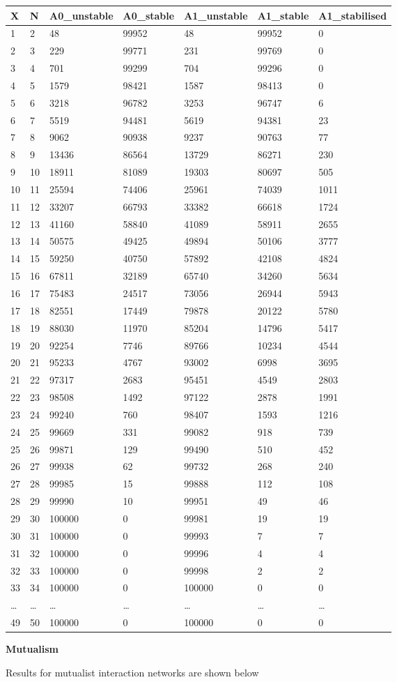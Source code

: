 \documentclass[]{article}
\begin{document}
\begin{longtable}[]{@{}lllllll@{}}
\toprule
X & N & A0\_unstable & A0\_stable & A1\_unstable & A1\_stable &
A1\_stabilised\tabularnewline
\midrule
\endhead
1 & 2 & 48 & 99952 & 48 & 99952 & 0\tabularnewline
2 & 3 & 229 & 99771 & 231 & 99769 & 0\tabularnewline
3 & 4 & 701 & 99299 & 704 & 99296 & 0\tabularnewline
4 & 5 & 1579 & 98421 & 1587 & 98413 & 0\tabularnewline
5 & 6 & 3218 & 96782 & 3253 & 96747 & 6\tabularnewline
6 & 7 & 5519 & 94481 & 5619 & 94381 & 23\tabularnewline
7 & 8 & 9062 & 90938 & 9237 & 90763 & 77\tabularnewline
8 & 9 & 13436 & 86564 & 13729 & 86271 & 230\tabularnewline
9 & 10 & 18911 & 81089 & 19303 & 80697 & 505\tabularnewline
10 & 11 & 25594 & 74406 & 25961 & 74039 & 1011\tabularnewline
11 & 12 & 33207 & 66793 & 33382 & 66618 & 1724\tabularnewline
12 & 13 & 41160 & 58840 & 41089 & 58911 & 2655\tabularnewline
13 & 14 & 50575 & 49425 & 49894 & 50106 & 3777\tabularnewline
14 & 15 & 59250 & 40750 & 57892 & 42108 & 4824\tabularnewline
15 & 16 & 67811 & 32189 & 65740 & 34260 & 5634\tabularnewline
16 & 17 & 75483 & 24517 & 73056 & 26944 & 5943\tabularnewline
17 & 18 & 82551 & 17449 & 79878 & 20122 & 5780\tabularnewline
18 & 19 & 88030 & 11970 & 85204 & 14796 & 5417\tabularnewline
19 & 20 & 92254 & 7746 & 89766 & 10234 & 4544\tabularnewline
20 & 21 & 95233 & 4767 & 93002 & 6998 & 3695\tabularnewline
21 & 22 & 97317 & 2683 & 95451 & 4549 & 2803\tabularnewline
22 & 23 & 98508 & 1492 & 97122 & 2878 & 1991\tabularnewline
23 & 24 & 99240 & 760 & 98407 & 1593 & 1216\tabularnewline
24 & 25 & 99669 & 331 & 99082 & 918 & 739\tabularnewline
25 & 26 & 99871 & 129 & 99490 & 510 & 452\tabularnewline
26 & 27 & 99938 & 62 & 99732 & 268 & 240\tabularnewline
27 & 28 & 99985 & 15 & 99888 & 112 & 108\tabularnewline
28 & 29 & 99990 & 10 & 99951 & 49 & 46\tabularnewline
29 & 30 & 100000 & 0 & 99981 & 19 & 19\tabularnewline
30 & 31 & 100000 & 0 & 99993 & 7 & 7\tabularnewline
31 & 32 & 100000 & 0 & 99996 & 4 & 4\tabularnewline
32 & 33 & 100000 & 0 & 99998 & 2 & 2\tabularnewline
33 & 34 & 100000 & 0 & 100000 & 0 & 0\tabularnewline
\ldots{} & \ldots{} & \ldots{} & \ldots{} & \ldots{} & \ldots{} &
\ldots{}\tabularnewline
49 & 50 & 100000 & 0 & 100000 & 0 & 0\tabularnewline
\bottomrule
\end{longtable}

\textbf{Mutualism}

Results for mutualist interaction networks are shown below
\end{document}
